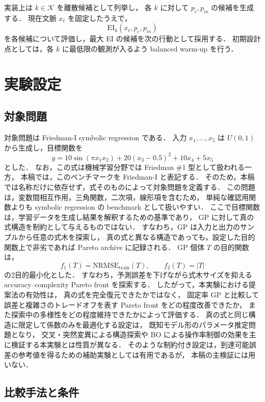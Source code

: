 \documentclass[a4paper,10pt,twocolumn]{ltjsarticle}
\newcommand{\EI}{\mathrm{EI}}
\begin{document}
実装上は \(k\in\mathcal{K}\) を離散候補として列挙し，
各 \(k\) に対して \(p_c,p_m\) の候補を生成する．
現在文脈 \(x_\ell\) を固定したうえで，
\[
\EI_k(x_\ell,p_c,p_m)
\]
を各候補について評価し，最大 EI の候補を次の行動として採用する．
初期設計点としては，各 \(k\) に最低限の観測が入るよう balanced warm-up を行う．

\section{実験設定}

\subsection{対象問題}

対象問題は Friedman-I symbolic regression である．
入力 \(x_1,\ldots,x_5\) は \(U(0,1)\) から生成し，目標関数を
\begin{equation}
y=
10\sin(\pi x_1x_2)
+20(x_3-0.5)^2
+10x_4
+5x_5
\end{equation}
とした．
なお，この式は機械学習分野では Friedman \#1 型として扱われる一方，
本稿では，このベンチマークを Friedman-I と表記する．
そのため，本稿では名称だけに依存せず，式そのものによって対象問題を定義する．
この問題は，変数間相互作用，三角関数，二次項，線形項を含むため，
単純な確認用関数よりも symbolic regression の benchmark として扱いやすい．
ここで目標関数は，学習データを生成し結果を解釈するための基準であり，
GP に対して真の式構造を制約として与えるものではない．
すなわち，GP は入力と出力のサンプルから任意の式木を探索し，
真の式と異なる構造であっても，設定した目的関数上で非劣であれば Pareto archive に記録される．
GP 個体 \(T\) の目的関数は，
\begin{equation}
f_1(T)=\mathrm{NRMSE}_{\mathrm{train}}(T),
\qquad
f_2(T)=|T|
\end{equation}
の2目的最小化とした．
すなわち，予測誤差を下げながら式木サイズを抑える accuracy--complexity Pareto front を探索する．
したがって，本実験における提案法の有効性は，
真の式を完全復元できたかではなく，
固定率 GP と比較して誤差と複雑さのトレードオフを表す Pareto front をどの程度改善できたか，
また探索中の多様性をどの程度維持できたかによって評価する．
真の式と同じ構造に限定して係数のみを最適化する設定は，
既知モデル形のパラメータ推定問題となり，
交叉・突然変異による構造探索や BO による操作率制御の効果を主に検証する本実験とは性質が異なる．
そのような制約付き設定は，到達可能誤差の参考値を得るための補助実験としては有用であるが，
本稿の主検証には用いない．

\subsection{比較手法と条件}
\end{document}
